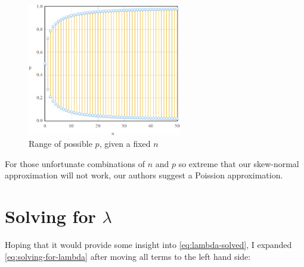 \documentclass{article}
\begin{document}
\begin{figure}
  \centering
  \includegraphics[width=0.6\textwidth]{../graphs/images/restriction-p-range.png}
  \caption{Range of possible $p$, given a fixed $n$}
  \label{fig:sn-restriction-p-range}
\end{figure}

For those unfortunate combinations of $n$ and $p$ so extreme that our
skew-normal approximation will not work, our authors suggest a Poission
approximation.

\appendix
\section{Solving for $\lambda$}
\label{sec:solving-for-lambda}

Hoping that it would provide some insight into \eqref{eq:lambda-solved}, I
expanded \eqref{eq:solving-for-lambda} after moving all terms to the left hand
side:
\end{document}
